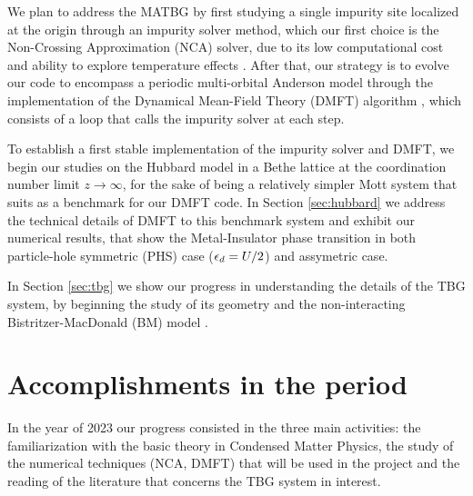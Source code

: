 \documentclass[12pt]{report}
\begin{document}
We plan to address the MATBG by first studying a single impurity site localized at the origin through an impurity solver method, which our first choice is the Non-Crossing Approximation (NCA) solver, due to its low computational cost and ability to explore temperature effects \cite{impurity-solvers}. After that, our strategy is to evolve our code to encompass a periodic multi-orbital Anderson model through the implementation of the Dynamical Mean-Field Theory (DMFT) algorithm \cite{georges1996}, which consists of a loop that calls the impurity solver at each step.

To establish a first stable implementation of the impurity solver and DMFT, we begin our studies on the Hubbard model in a Bethe lattice at the coordination number limit $z\to\infty$, for the sake of being a relatively simpler Mott system that suits as a benchmark for our DMFT code. In Section \ref{sec:hubbard} we address the technical details of DMFT to this benchmark system and exhibit our numerical results, that show the Metal-Insulator phase transition in both particle-hole symmetric (PHS) case ($\epsilon_d = U/2$) and assymetric case.

In Section \ref{sec:tbg} we show our progress in understanding the details of the TBG system, by beginning the study of its geometry \cite{handbook2019} and the non-interacting Bistritzer-MacDonald (BM) model \cite{macdonald2011}.

\chapter{Accomplishments in the period} \label{chp:accomplishments}

In the year of 2023 our progress consisted in the three main activities: the familiarization with the basic theory in Condensed Matter Physics, the study of the numerical techniques (NCA, DMFT) that will be used in the project and the reading of the literature that concerns the TBG system in interest.
\end{document}
